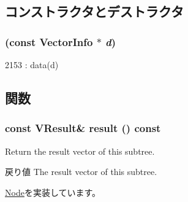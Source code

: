 \subsection{コンストラクタとデストラクタ}
\hypertarget{classStats_1_1VectorStatNode_ac1b3c9ea9bbf5739d66c078719b5d595}{
\subsubsection[{VectorStatNode}]{ (const {\bf VectorInfo} $\ast$ {\em d})}}
\label{classStats_1_1VectorStatNode_ac1b3c9ea9bbf5739d66c078719b5d595}



\begin{DoxyCode}
2153 : data(d) { }
\end{DoxyCode}


\subsection{関数}
\hypertarget{classStats_1_1VectorStatNode_aba312f9e3431b1652f8b3ddf3fe105dc}{
\subsubsection[{result}]{\setlength{\rightskip}{0pt plus 5cm}const {\bf VResult}\& result () const}}
\label{classStats_1_1VectorStatNode_aba312f9e3431b1652f8b3ddf3fe105dc}
Return the result vector of this subtree. \begin{DoxyReturn}{戻り値}
The result vector of this subtree. 
\end{DoxyReturn}


\hyperlink{classStats_1_1Node_a7fcf57115122663db42f39cc18ca0f62}{Node}を実装しています。


